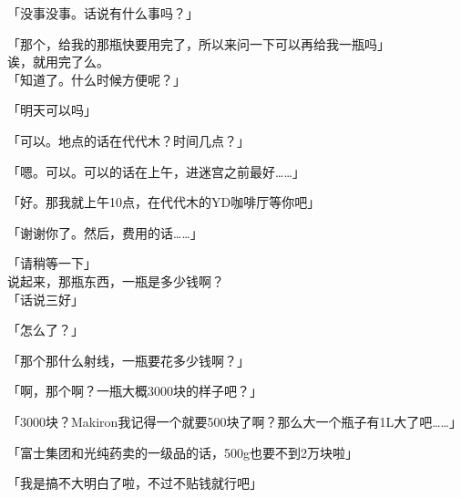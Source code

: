 「没事没事。话说有什么事吗？」

「那个，给我的那瓶快要用完了，所以来问一下可以再给我一瓶吗」\\

诶，就用完了么。\\

「知道了。什么时候方便呢？」

「明天可以吗」

「可以。地点的话在代代木？时间几点？」

「嗯。可以。可以的话在上午，进迷宫之前最好……」

「好。那我就上午10点，在代代木的YD咖啡厅等你吧」

「谢谢你了。然后，费用的话……」

「请稍等一下」\\

说起来，那瓶东西，一瓶是多少钱啊？\\

「话说三好」

「怎么了？」

「那个那什么射线，一瓶要花多少钱啊？」

「啊，那个啊？一瓶大概3000块的样子吧？」

「3000块？Makiron我记得一个就要500块了啊？那么大一个瓶子有1L大了吧……」

「富士集团和光纯药卖的一级品的话，500g也要不到2万块啦」

「我是搞不大明白了啦，不过不贴钱就行吧」\\

